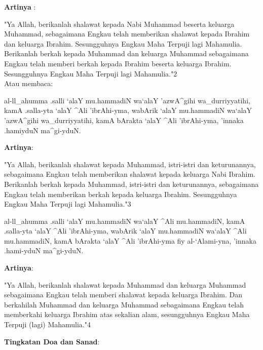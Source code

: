 \documentclass[a4paper,12pt]{article}
\begin{document}
\noindent
\textbf{Artinya} :
\par
\indent
"Ya Allah, berikanlah shalawat kepada Nabi Muhammad beserta keluarga 
Muhammad, sebagaimana Engkau telah memberikan shalawat kepada Ibrahim dan 
keluarga Ibrahim. Sesungguhnya Engkau Maha Terpuji lagi Mahamulia. 
Berikanlah berkah kepada Muhammad dan keluarga Muhammad sebagaimana Engkau 
telah memberi berkah kepada Ibrahim beserta keluarga Ibrahim. Sesungguhnya 
Engkau Maha Terpuji lagi Mahamulia."{\scriptsize 2}\\
Atau membaca:\\
\begin{arabtext}
\noindent
al-ll_ahumma .salli `alaY mu.hammadiN wa`alaY 'azwA^gihi wa_durriyyatihi, 
kamA .salla-yta `alaY ^Ali 'ibrAhi-yma, wabArik `alaY mu.hammadiN wa`alaY 
'azwA^gihi wa_durriyyatihi, kamA bArakta `alaY ^Ali 'ibrAhi-yma, 'innaka 
.hamiyduN ma^gi-yduN.\\
\end{arabtext}
\noindent
\textbf{Artinya}:
\par
\indent
"Ya Allah, berikanlah shalawat kepada Muhammad, istri-istri dan 
keturunannya, sebagaimana Engkau telah memberikan shalawat kepada keluarga 
Nabi Ibrahim. Berikanlah berkah kepada Muhammad, istri-istri dan 
keturunannya, sebagaimana Engkau telah memberikan berkah kepada keluarga 
Ibrahim. Sesungguhnya Engkau Maha Terpuji lagi Mahamulia."{\scriptsize 3}\\
\begin{arabtext}
\noindent
al-ll_ahumma .salli `alaY mu.hammadiN wa`alaY ^Ali mu.hammadiN, kamA 
.salla-yta `alaY ^Ali 'ibrAhi-yma, wabArik `alaY mu.hammadiN wa`alaY ^Ali 
mu.hammadiN, kamA bArakta `alaY ^Ali 'ibrAhi-yma fiy al-`Alami-yna, 'innaka 
.hami-yduN ma^gi-yduN.\\
\end{arabtext}
\noindent
\textbf{Artinya}:
\par
\indent
"Ya Allah, berikanlah shalawat kepada Muhammad dan keluarga Muhammad 
sebagaimana Engkau telah memberi shalawat kepada keluarga Ibrahim. Dan 
berkahilah Muhammad dan keluarga Muhammad sebagaimana Engkau telah 
memberkahi keluarga Ibrahim atas sekalian alam, sesungguhnya Engkau Maha 
Terpuji (lagi) Mahamulia."{\scriptsize 4}\\
\par
\noindent
\textbf{Tingkatan Doa dan Sanad}:
\end{document}
